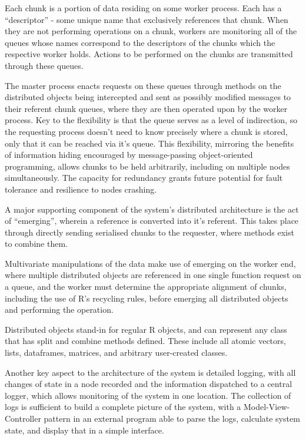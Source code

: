 Each chunk is a portion of data residing on some worker process.
Each has a ``descriptor'' - some unique name that exclusively references that chunk.
When they are not performing operations on a chunk, workers are monitoring all of the queues whose names correspond to the descriptors of the chunks which the respective worker holds.
Actions to be performed on the chunks are transmitted through these queues.

The master process enacts requests on these queues through methods on the distributed objects being intercepted and sent as possibly modified messages to their referent chunk queues, where they are then operated upon by the worker process.
Key to the flexibility is that the queue serves as a level of indirection, so the requesting process doesn't need to know precisely where a chunk is stored, only that it can be reached via it's queue.
This flexibility, mirroring the benefits of information hiding encouraged by message-passing object-oriented programming, allows chunks to be held arbitrarily, including on multiple nodes simultaneously.
The capacity for redundancy grants future potential for fault tolerance and resilience to nodes crashing.

A major supporting component of the system's distributed architecture is the act of ``emerging'', wherein a reference is converted into it's referent.
This takes place through directly sending serialised chunks to the requester, where methods exist to combine them.

Multivariate manipulations of the data make use of emerging on the worker end, where multiple distributed objects are referenced in one single function request on a queue, and the worker must determine the appropriate alignment of chunks, including the use of R's recycling rules, before emerging all distributed objects and performing the operation.

Distributed objects stand-in for regular R objects, and can represent any class that has split and combine methods defined.
These include all atomic vectors, lists, dataframes, matrices, and arbitrary user-created classes.

Another key aspect to the architecture of the system is detailed logging, with all changes of state in a node recorded and the information dispatched to a central logger, which allows monitoring of the system in one location. The collection of logs is sufficient to build a complete picture of the system, with a Model-View-Controller pattern in an external program able to parse the logs, calculate system state, and display that in a simple interface.

